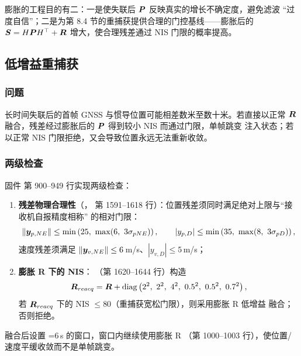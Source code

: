 \begin{remark}
膨胀的工程目的有二：一是使失联后 $\boldsymbol{P}$ 反映真实的增长不确定度，避免滤波
``过度自信''；二是为第 8.4 节的重捕获提供合理的门控基线——膨胀后的
$\boldsymbol{S} = H\boldsymbol{P}H^{\top} + \boldsymbol{R}$ 增大，使合理残差通过 NIS 门限的概率提高。
\end{remark}

\subsection{低增益重捕获}

\subsubsection{问题}

长时间失联后的首帧 GNSS 与惯导位置可能相差数米至数十米。若直接以正常
$\boldsymbol{R}$ 融合，残差经过膨胀后的 $\boldsymbol{P}$ 得到较小 NIS 而通过门限，单帧跳变
注入状态；若以正常 NIS 门限拒绝，又会导致位置永远无法重新收敛。

\subsubsection{两级检查}

固件  第 900--949 行实现两级检查：
\begin{enumerate}
  \item \textbf{残差物理合理性}（，
    第 1591--1618 行）：位置残差须同时满足绝对上限与``接收机自报精度相称''
    的相对门限：
    \begin{equation}
      \|\vp{y}_{p,NE}\| \le \min\left(25,\ \max(6,\ 3\sigma_{pNE})\right),
      \qquad
      |y_{p,D}| \le \min\left(35,\ \max(8,\ 3\sigma_{pD})\right),
      \label{eq:reacq-pos-gate}
    \end{equation}
    速度残差须满足 $\|\boldsymbol{y}_{v,NE}\| \le 6$\,m/s、$|y_{v,D}| \le 5$\,m/s；
  \item \textbf{膨胀 R 下的 NIS}：
    （第 1620--1644 行）构造
    \begin{equation}
      \m{R}_{reacq} = \m{R} + \diag\left(2^2,\ 2^2,\ 4^2,\ 0.5^2,\ 0.5^2,\ 0.7^2\right),
      \label{eq:reacq-R}
    \end{equation}
    若 $\boldsymbol{R}_{reacq}$ 下的 NIS $\le 80$（重捕获宽松门限），则采用膨胀 R 低增益
    融合；否则拒绝。
\end{enumerate}
融合后设置 =6\,s 的窗口，窗口内继续使用膨胀 R
（第 1000--1003 行），使位置/速度平缓收敛而不是单帧跳变。

